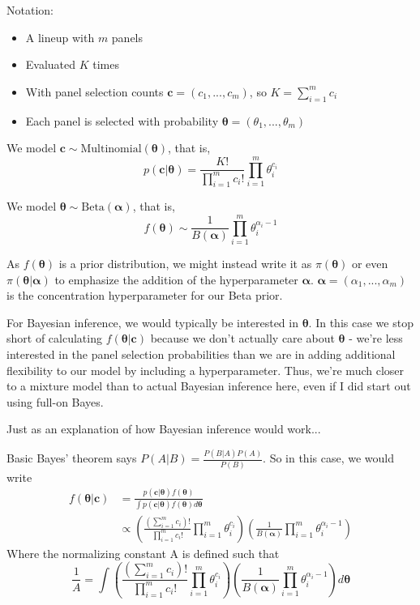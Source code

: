 \documentclass{article}
\begin{document}
Notation:
\begin{itemize}
\item A lineup with $m$ panels
\item Evaluated $K$ times
\item With panel selection counts $\bm c = (c_1, ..., c_m)$, so $K = \sum_{i=1}^m c_i$
\item Each panel is selected with probability $\bm\theta = (\theta_1, ..., \theta_m)$
\end{itemize}

We model $\bm c \sim \text{Multinomial}(\bm\theta)$, that is, 
$$p(\bm c | \bm \theta) = \frac{K!}{\prod_{i=1}^m c_i!} \prod_{i=1}^m \theta_i^{c_i}$$

We model $\bm \theta  \sim \text{Beta}(\bm \alpha)$, that is, 
$$f(\bm \theta) \sim \frac{1}{B(\bm \alpha)} \prod_{i=1}^m\theta_i^{\alpha_i - 1}$$

As $f(\bm\theta)$ is a prior distribution, we might instead write it as $\pi(\bm\theta)$ or even $\pi(\bm\theta|\bm\alpha)$ to emphasize the addition of the hyperparameter $\bm\alpha$. $\bm\alpha = (\alpha_1, ..., \alpha_m)$ is the concentration hyperparameter for our Beta prior. 

For Bayesian inference, we would typically be interested in $\bm\theta$. In this case we stop short of calculating $f(\bm\theta|\bm c)$ because we don't actually care about $\bm\theta$ - we're less interested in the panel selection probabilities than we are in adding additional flexibility to our model by including a hyperparameter. Thus, we're much closer to a mixture model than to actual Bayesian inference here, even if I did start out using full-on Bayes. 

Just as an explanation of how Bayesian inference would work...

Basic Bayes' theorem says $P(A|B) = \displaystyle\frac{P(B|A)P(A)}{P(B)}$. So in this case, we would write 
\begin{align*}
f(\bm\theta | \bm c) &= \frac{p(\bm c|\bm\theta)f(\bm \theta)}{\int p(\bm c|\bm \theta)f(\bm\theta) d\bm\theta}\\
&\propto \left(\frac{\left(\sum_{i=1}^m c_i\right)!}{\prod_{i=1}^m c_i!}\prod_{i=1}^m\theta_i^{c_i}\right)\left(\frac{1}{B(\bm\alpha)}\prod_{i=1}^m\theta_i^{\alpha_i - 1}\right)
\end{align*}
Where the normalizing constant A is defined such that $$\frac{1}{A} = \displaystyle\int\left(\frac{\left(\sum_{i=1}^m c_i\right)!}{\prod_{i=1}^m c_i!}\prod_{i=1}^m\theta_i^{c_i}\right)\left(\frac{1}{B(\bm\alpha)}\prod_{i=1}^m\theta_i^{\alpha_i - 1}\right)d\bm\theta $$
\end{document}
